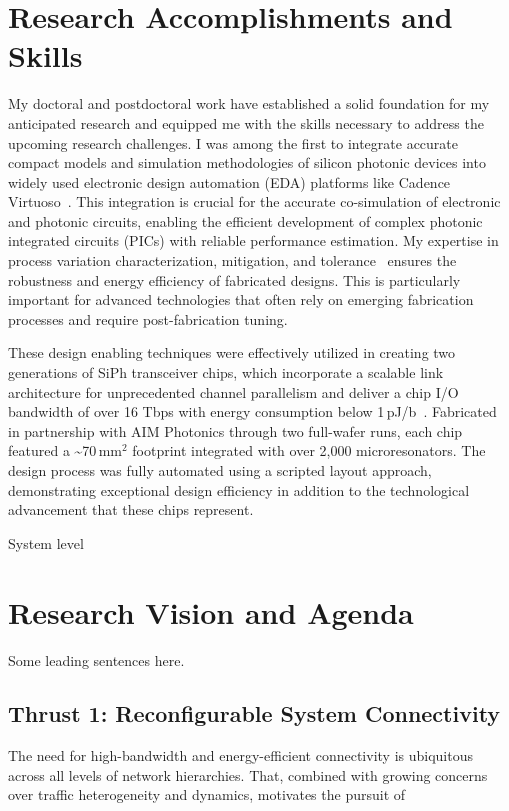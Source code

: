 \section{Research Accomplishments and Skills}
My doctoral and postdoctoral work have established a solid foundation for my anticipated research and equipped me with the skills necessary to address the upcoming research challenges. I was among the first to integrate accurate compact models and simulation methodologies of silicon photonic devices into widely used electronic design automation (EDA) platforms like Cadence Virtuoso~\cite{wuCompactModelingCircuitlevel2017,zhangCompactModelingSilicon2017}. This integration is crucial for the accurate co-simulation of electronic and photonic circuits, enabling the efficient development of complex photonic integrated circuits (PICs) with reliable performance estimation. My expertise in process variation characterization, mitigation, and tolerance~\cite{wangCharacterizationApplicationsSpatial2020,wangEnergyEfficiencyYield2021,wangDispersionEngineeredFabricationRobustSOI2023} ensures the robustness and energy efficiency of fabricated designs. This is particularly important for advanced technologies that often rely on emerging fabrication processes and require post-fabrication tuning.

These design enabling techniques were effectively utilized in creating two generations of SiPh transceiver chips, which incorporate a scalable link architecture for unprecedented channel parallelism and deliver a chip I/O bandwidth of over 16 Tbps with energy consumption below 1\,pJ/b~\cite{wangScalableArchitectureSubpJ2023,wangCICC2024}. Fabricated in partnership with AIM Photonics through two full-wafer runs, each chip featured a \textasciitilde{}70\,mm$^\text{2}$ footprint integrated with over 2,000 microresonators. The design process was fully automated using a scripted layout approach, demonstrating exceptional design efficiency in addition to the technological advancement that these chips represent.

System level \cite{wangTaskMappingAssistedLaser2019,wangTrafficAdaptivePowerReconfiguration2021,brianJOCN}

\section{Research Vision and Agenda}
Some leading sentences here.
\subsection{Thrust 1: Reconfigurable System Connectivity}
The need for high-bandwidth and energy-efficient connectivity is ubiquitous across all levels of network hierarchies. That, combined with growing concerns over traffic heterogeneity and dynamics, motivates the pursuit of


